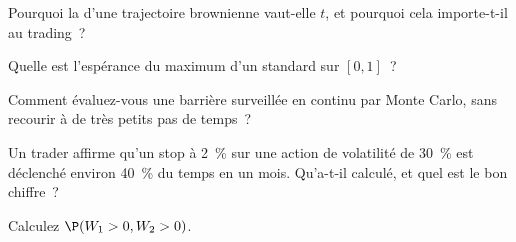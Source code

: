\begin{interviewq}\label{iq:qm:brownian-motion:2}
Pourquoi la  d'une trajectoire brownienne vaut-elle $t$, et pourquoi cela importe-t-il au trading~?
\end{interviewq}

\begin{interviewq}\label{iq:qm:brownian-motion:3}
Quelle est l'espérance du maximum d'un  standard sur $[0,1]$~?
\end{interviewq}

\begin{interviewq}\label{iq:qm:brownian-motion:4}
Comment évaluez-vous une barrière surveillée en continu par Monte Carlo, sans recourir à de très petits pas de temps~?
\end{interviewq}

\begin{interviewq}\label{iq:qm:brownian-motion:5}
Un trader affirme qu'un stop à 2~\% sur une action de volatilité de 30~\% est déclenché environ 40~\% du temps en un
mois. Qu'a-t-il calculé, et quel est le bon chiffre~?
\end{interviewq}

\begin{interviewq}\label{iq:qm:brownian-motion:6}
Calculez $\P(W_1 > 0, W_2 > 0)$.
\end{interviewq}
